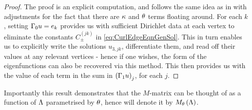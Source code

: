 \begin{proof}
	The proof is an explicit computation, and follows the same idea as in \cite{ershova2014isospectrality} with adjustments for the fact that there are $\kappa$ and $\theta$ terms floating around.
	For each $k$, setting $\Gamma_0 u = e_k$ provides us with sufficient Dirichlet data at each vertex to eliminate the constants $C^{(jk)}_{\pm}$ in \eqref{eq:CurlEdgeEqnGenSol}.
	This in turn enables us to explicitly write the solutions $u_{3,jk}$, differentiate them, and read off their values at any relevant vertices - hence if one wishes, the form of the eigenfunctions can also be recovered via this method.
	This then provides us with the value of each term in the sum in $\left( \Gamma_1 u \right)_j$, for each $j$.
\end{proof}
Importantly this result demonstrates that the $M$-matrix can be thought of as a function of $\Lambda$ parametrised by $\theta$, hence will denote it by $M_{\theta}\left( \Lambda \right)$.